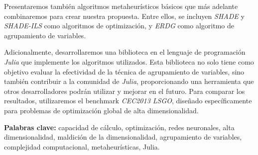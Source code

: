 Presentaremos también algoritmos metaheurísticos básicos que más adelante combinaremos para crear nuestra propuesta. Entre ellos, se incluyen \textit{SHADE} y \textit{SHADE-ILS} como algoritmos de optimización, y \textit{ERDG} como algoritmo de agrupamiento de variables.

Adicionalmente, desarrollaremos una biblioteca en el lenguaje de programación \textit{Julia} que implemente los algoritmos utilizados. Esta biblioteca no solo tiene como objetivo evaluar la efectividad de la técnica de agrupamiento de variables, sino también contribuir a la comunidad de \textit{Julia}, proporcionando una herramienta que otros desarrolladores podrán utilizar y mejorar en el futuro. Para comparar los resultados, utilizaremos el benchmark \textit{CEC2013 LSGO}, diseñado específicamente para problemas de optimización global de alta dimensionalidad.

\textbf{Palabras clave:} capacidad de cálculo, optimización, redes neuronales, alta dimensionalidad, maldición de la dimensionalidad, agrupamiento de variables, complejidad computacional, metaheurísticas, Julia.

\endinput

